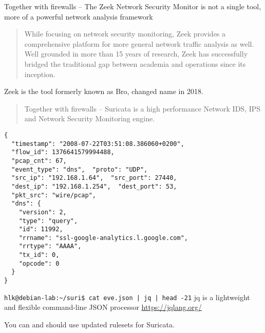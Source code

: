 \documentclass[Screen16to9,17pt]{foils}
\begin{document}

Together with firewalls -- The Zeek Network Security Monitor is not a single tool, more of a powerful network analysis framework


\begin{quote}
While focusing on network security monitoring, Zeek provides a comprehensive platform for more general network traffic analysis as well. Well grounded in more than 15 years of research, Zeek has successfully bridged the traditional gap between academia and operations since its inception.
\end{quote}

Zeek is the tool formerly known as Bro, changed name in 2018. 




\begin{quote}
Together with firewalls -- Suricata is a high performance Network IDS, IPS and Network Security Monitoring engine.
\end{quote}





\begin{verbatim}
{
  "timestamp": "2008-07-22T03:51:08.386060+0200",
  "flow_id": 1376641579994488,
  "pcap_cnt": 67,
  "event_type": "dns",  "proto": "UDP",
  "src_ip": "192.168.1.64",  "src_port": 27440,
  "dest_ip": "192.168.1.254",  "dest_port": 53,
  "pkt_src": "wire/pcap",
  "dns": {
    "version": 2,
    "type": "query",
    "id": 11992,
    "rrname": "ssl-google-analytics.l.google.com",
    "rrtype": "AAAA",
    "tx_id": 0,
    "opcode": 0
  }
}
\end{verbatim}

\begin{list2}
\item
\verb+hlk@debian-lab:~/suri$ cat eve.json | jq | head -21+
jq is a lightweight and flexible command-line JSON processor \url{https://jqlang.org/}
\end{list2}





You can and should use updated rulesets for Suricata.
\end{document}
